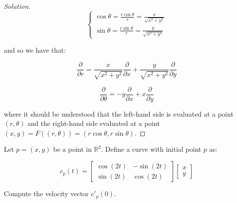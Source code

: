 \documentclass[10pt]{article}
\newenvironment{problem}[2][]{\begin{trivlist}
\item[\hskip \labelsep {\bfseries #1}\hskip \labelsep {\bfseries #2.}]}{\end{trivlist}}
\begin{document}
\begin{proof}[Solution]
$$\begin{cases} \cos \theta = \frac{r \cos \theta}{r} = \frac{x}{\sqrt{x^2 + y^2}} \\  \sin \theta = \frac{r \sin \theta}{r} = \frac{y}{\sqrt{x^2 + y^2} } \end{cases} $$

and so we have that:

$$\frac{\partial}{\partial r} = \frac{x}{\sqrt{x^2 + y^2}} \frac{\partial}{\partial x} + \frac{y}{\sqrt{x^2 + y^2}} \frac{\partial}{\partial y} $$

$$ \frac{\partial}{\partial \theta} = -y \frac{\partial}{\partial x} + x  \frac{\partial}{\partial y}$$

where it should be understood that the left-hand side is evaluated at a point $(r,\theta)$ and the right-hand side evaluated at a point $(x,y) = F((r,\theta)) = (r \cos \theta, r \sin \theta)$.

\end{proof}

\begin{problem}{Question 4}

Let $p = (x,y)$ be a point in $\mathbb{R}^2$. Define a curve with initial point $p$ as:

$$c_p(t) = \begin{bmatrix} \cos(2t) & -\sin(2t) \\ \sin(2t) & \cos(2t) \end{bmatrix} \begin{bmatrix} x \\ y \end{bmatrix} $$

Compute the velocity vector $c'_p(0)$.

\end{problem}
\end{document}
